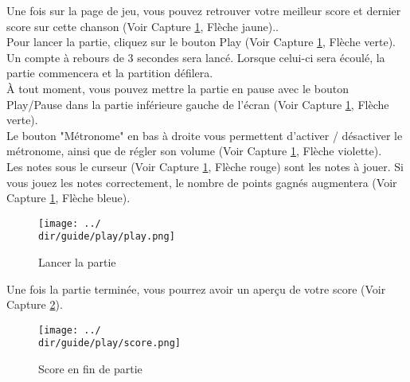 Une fois sur la page de jeu, vous pouvez retrouver votre meilleur score et dernier score sur cette chanson (Voir Capture \ref{fig:play}, Flèche jaune)..
\\
Pour lancer la partie, cliquez sur le bouton Play (Voir Capture \ref{fig:play}, Flèche verte). Un compte à rebours de 3 secondes sera lancé. Lorsque celui-ci sera écoulé, la partie commencera et la partition défilera.
\\
À tout moment, vous pouvez mettre la partie en pause avec le bouton Play/Pause dans la partie inférieure gauche de l'écran (Voir Capture \ref{fig:play}, Flèche verte).
\\
Le bouton "Métronome" en bas à droite vous permettent d'activer / désactiver le métronome, ainsi que de régler son volume (Voir Capture \ref{fig:play}, Flèche violette).
\\
Les notes sous le curseur (Voir Capture \ref{fig:play}, Flèche rouge) sont les notes à jouer. Si vous jouez les notes correctement, le nombre de points gagnés augmentera (Voir Capture \ref{fig:play}, Flèche bleue).

\begin{figure}[H]
	\texttt{[image: ../\\dir/guide/play/play.png]}
	\caption{Lancer la partie}
	\label{fig:play}
\end{figure}

Une fois la partie terminée, vous pourrez avoir un aperçu de votre score (Voir Capture \ref{fig:score}).

\begin{figure}[H]
	\texttt{[image: ../\\dir/guide/play/score.png]}
	\caption{Score en fin de partie}
	\label{fig:score}
\end{figure}